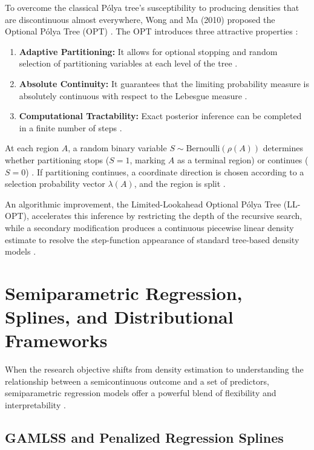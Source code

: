 To overcome the classical Pólya tree's susceptibility to producing densities that are discontinuous almost everywhere, Wong and Ma (2010) proposed the Optional Pólya Tree (OPT) \cite{wong2010}. The OPT introduces three attractive properties \cite{wong2010}:
\begin{enumerate}
    \item \textbf{Adaptive Partitioning:} It allows for optional stopping and random selection of partitioning variables at each level of the tree \cite{wong2010}.
    \item \textbf{Absolute Continuity:} It guarantees that the limiting probability measure is absolutely continuous with respect to the Lebesgue measure \cite{wong2010}.
    \item \textbf{Computational Tractability:} Exact posterior inference can be completed in a finite number of steps \cite{wong2010}.
\end{enumerate}

At each region $A$, a random binary variable $S \sim \text{Bernoulli}(\rho(A))$ determines whether partitioning stops ($S=1$, marking $A$ as a terminal region) or continues ($S=0$) \cite{wong2010}. If partitioning continues, a coordinate direction is chosen according to a selection probability vector $\lambda(A)$, and the region is split \cite{wong2010}. 

An algorithmic improvement, the Limited-Lookahead Optional Pólya Tree (LL-OPT), accelerates this inference by restricting the depth of the recursive search, while a secondary modification produces a continuous piecewise linear density estimate to resolve the step-function appearance of standard tree-based density models \cite{wong2010}.

\section{Semiparametric Regression, Splines, and Distributional Frameworks}

When the research objective shifts from density estimation to understanding the relationship between a semicontinuous outcome and a set of predictors, semiparametric regression models offer a powerful blend of flexibility and interpretability \cite{olsen2001, wood2017}.

\subsection{GAMLSS and Penalized Regression Splines}

